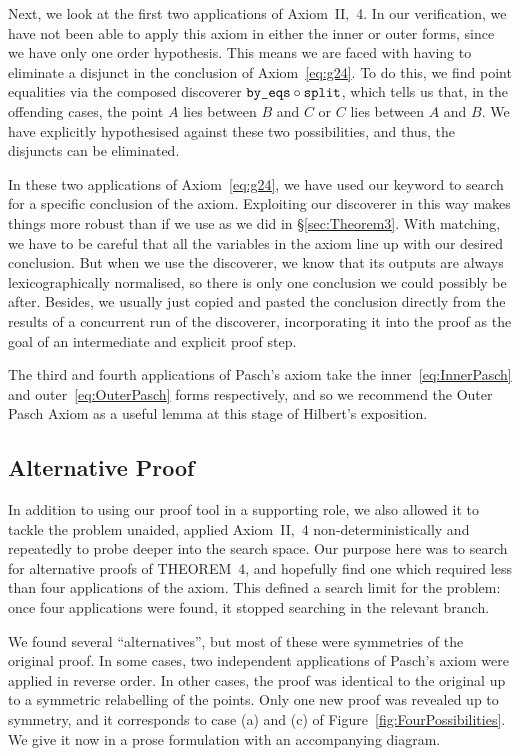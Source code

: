 Next, we look at the first two applications of Axiom~II,~4. In our verification, we have not been able to apply this axiom in either the inner or outer forms, since we have only one order hypothesis. This means we are faced with having to eliminate a disjunct in the conclusion of Axiom~\ref{eq:g24}. To do this, we find point equalities via the composed discoverer $\texttt{by\_eqs}\circ\texttt{split}$, which tells us that, in the offending cases, the point $A$ lies between $B$ and $C$ or $C$ lies between $A$ and $B$. We have explicitly hypothesised against these two possibilities, and thus, the disjuncts can be eliminated.

In these two applications of Axiom~\ref{eq:g24}, we have used our  keyword to search for a specific conclusion of the axiom. Exploiting our discoverer in this way makes things more robust than if we use  as we did in \S\ref{sec:Theorem3}. With matching, we have to be careful that all the variables in the axiom line up with our desired conclusion. But when we use the discoverer, we know that its outputs are always lexicographically normalised, so there is only one conclusion we could possibly be after. Besides, we usually just copied and pasted the conclusion directly from the results of a concurrent run of the discoverer, incorporating it into the proof as the goal of an intermediate and explicit proof step.

The third and fourth applications of Pasch's axiom take the inner~\eqref{eq:InnerPasch} and outer~\eqref{eq:OuterPasch} forms respectively, and so we recommend the Outer Pasch Axiom as a useful lemma at this stage of Hilbert's exposition.

\subsection{Alternative Proof}\label{sec:FourAlternative}
In addition to using our proof tool in a supporting role, we also allowed it to tackle the problem unaided, applied Axiom~II,~4 non-deterministically and repeatedly to probe deeper into the search space. Our purpose here was to search for alternative proofs of THEOREM~4, and hopefully find one which required less than four applications of the axiom. This defined a search limit for the problem: once four applications were found, it stopped searching in the relevant branch. 

We found several ``alternatives'', but most of these were symmetries of the original proof. In some cases, two independent applications of Pasch's axiom were applied in reverse order. In other cases, the proof was identical to the original up to a symmetric relabelling of the points. Only one new proof was revealed up to symmetry, and it corresponds to case (a) and (c) of Figure~\ref{fig:FourPossibilities}. We give it now in a prose formulation with an accompanying diagram.

